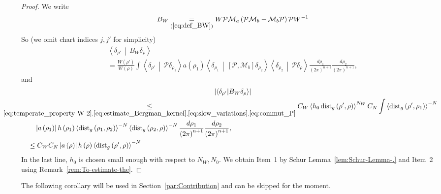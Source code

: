 \documentclass[10pt]{amsart}
\theoremstyle{definition}\newtheorem{defi}[theo]{Definition}\newtheorem{rema}[theo]{Remark}\newtheorem{exam}[theo]{Example}\newtheorem{exem}[theo]{Example}\newtheorem{nota}[theo]{Notation}
\newcommand*\eq[1]{\underset{(#1)}{=}}
\newcommand{\clM}{\mathcal{M}}
\newcommand{\clP}{\mathcal{P}}
\newcommand{\dist}{\mathrm{dist}}
\begin{document}
\begin{proof}
We write
\[
B_{W}\eq{\ref{eq:def_BW}}W\clP \clM_{a}\left(\clP \clM_{b}-\clM_{b}\clP \right)\clP W^{-1}
\]
So (we omit chart indices $j,j'$ for simplicity)
\begin{multline*}
\left\langle\delta_{\rho'}\,\middle|\,B_{W}\delta_{\rho}\right\rangle\\ =\frac{W\left(\rho'\right)}{W\left(\rho\right)}\int\left\langle\delta_{\rho'}\,\middle|\,\clP \delta_{\rho_{1}}\right\rangle a\left(\rho_{1}\right)\left\langle\delta_{\rho_{1}}\,\middle|\,\left[\clP ,\clM_{b}\right]\delta_{\rho_{2}}\right\rangle \left\langle\delta_{\rho_{2}}\,\middle|\,\clP \delta_{\rho}\right\rangle\frac{d\rho_{1}}{\left(2\pi\right)^{n+1}}\frac{d\rho_{2}}{\left(2\pi\right)^{n+1}},
\end{multline*}
and
\begin{multline*}
\left|\langle\delta_{\rho'}|B_{W}\delta_{\rho}\rangle\right|\\
\begin{aligned}
&\mkern-70mu\underset{\eqref{eq:temperate_property-W-2},\eqref{eq:estimate_Bergman_kernel},\eqref{eq:slow_variations},\eqref{eq:commut_P}}{\leq}  C_{W}\left\langle h_{0}\,\dist_{g}\left(\rho',\rho\right)\right\rangle ^{N_{W}}C_{N}\int\left\langle \dist_{g}\left(\rho',\rho_{1}\right)\right\rangle ^{-N}\\
& \quad\left|a\left(\rho_{1}\right)\right|h\left(\rho_{1}\right)\left\langle \dist_{g}\left(\rho_{1},\rho_{2}\right)\right\rangle ^{-N}\left\langle \dist_{g}\left(\rho_{2},\rho\right)\right\rangle ^{-N}\frac{d\rho_{1}}{\left(2\pi\right)^{n+1}}\frac{d\rho_{2}}{\left(2\pi\right)^{n+1}},\\
&\leq C_{W}C_{N}\left|a\left(\rho\right)\right|h\left(\rho\right)\left\langle \dist_{g}\left(\rho',\rho\right)\right\rangle ^{-N}
\end{aligned}
\end{multline*}
In the last line, $h_{0}$ is chosen small enough with respect to $N_{W},N_{0}$. We obtain Item~1 by Schur Lemma~\ref{lem:Schur-Lemma-.} and Item~2 using Remark~\ref{rem:To-estimate-the}.
\end{proof}

The following corollary will be used in Section~\ref{par:Contribution} and can be skipped for the moment.
\end{document}
